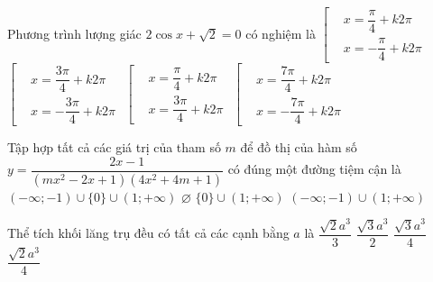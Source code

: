 \begin{ex}%
Phương trình lượng giác $2\cos x + \sqrt{2}=0$ có nghiệm là
	\def\dotEX{}
	\choice
	{$\left[\begin{aligned}&x=\dfrac{\pi}{4}+k2\pi\\&x=-\dfrac{\pi}{4}+k2\pi\end{aligned}\right.$}
	{\True $\left[\begin{aligned}&x=\dfrac{3\pi}{4}+k2\pi\\&x=-\dfrac{3\pi}{4}+k2\pi\end{aligned}\right.$}
	{$\left[\begin{aligned}&x=\dfrac{\pi}{4}+k2\pi\\&x=\dfrac{3\pi}{4}+k2\pi\end{aligned}\right.$}
	{$\left[\begin{aligned}&x=\dfrac{7\pi}{4}+k2\pi\\&x=-\dfrac{7\pi}{4}+k2\pi\end{aligned}\right.$}
\end{ex}
\begin{ex}%
Tập hợp tất cả các giá trị của tham số $m$ để đồ thị của hàm số $y=\dfrac{2x-1}{(mx^2-2x+1)(4x^2+4m+1)}$ có đúng một đường tiệm cận là
	\choice
	{$(-\infty;-1)\cup{\{0\}}\cup(1;+\infty)$}
	{$\varnothing$}
	{\True $\{0\}\cup(1;+\infty)$}
	{$(-\infty;-1)\cup(1;+\infty)$}
\end{ex}
\begin{ex}%
Thể tích khối lăng trụ đều có tất cả các cạnh bằng $a$ là
	\choice
	{$\dfrac{\sqrt{2}a^3}{3}$}
	{$\dfrac{\sqrt{3}a^3}{2}$}
	{\True $\dfrac{\sqrt{3}a^3}{4}$}
	{$\dfrac{\sqrt{2}a^3}{4}$}
\end{ex}
